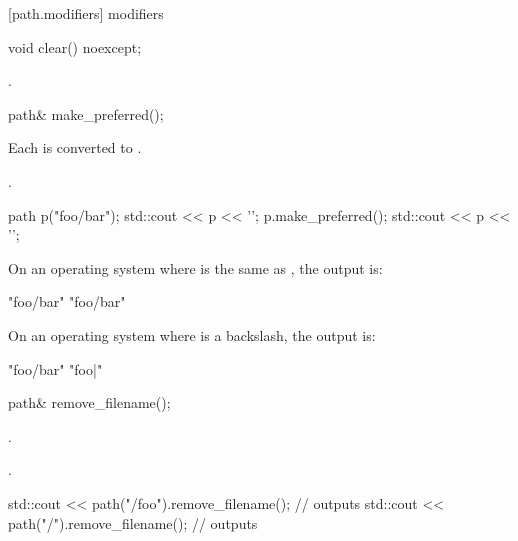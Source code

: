 [path.modifiers]{ modifiers}

%
\begin{itemdecl}
void clear() noexcept;
\end{itemdecl}

\begin{itemdescr}
\pnum
\postconditions {}.
\end{itemdescr}

%
\begin{itemdecl}
path& make_preferred();
\end{itemdecl}

\begin{itemdescr}
\pnum
\effects Each 
  is converted to .

\pnum
\returns {}.

\pnum
\begin{example}
\begin{codeblock}
path p("foo/bar");
std::cout << p << '\n';
p.make_preferred();
std::cout << p << '\n';
\end{codeblock}
On an operating system where  is the same as
, the output is:
\begin{codeblock}
"foo/bar"
"foo/bar"
\end{codeblock}
On an operating system where  is a backslash, the
output is:
\begin{codeblock}
"foo/bar"
"foo\bar"
\end{codeblock}
\end{example}
\end{itemdescr}

%
\begin{itemdecl}
path& remove_filename();
\end{itemdecl}

\begin{itemdescr}
\pnum
\postconditions {}.

\pnum
\returns {}.

\pnum
\begin{example}
\begin{codeblock}
std::cout << path("/foo").remove_filename();  // outputs 
std::cout << path("/").remove_filename();     // outputs 
\end{codeblock}
\end{example}
\end{itemdescr}

